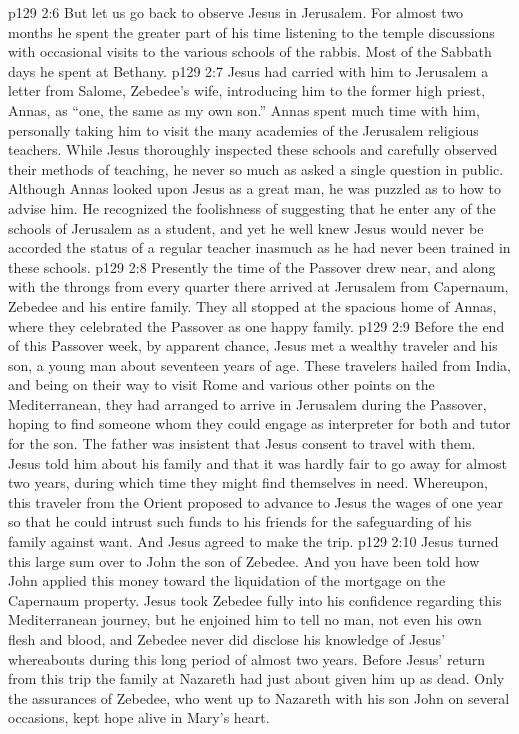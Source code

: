 \vs p129 2:6 \pc But let us go back to observe Jesus in Jerusalem. For almost two months he spent the greater part of his time listening to the temple discussions with occasional visits to the various schools of the rabbis. Most of the Sabbath days he spent at Bethany.
\vs p129 2:7 Jesus had carried with him to Jerusalem a letter from Salome, Zebedee’s wife, introducing him to the former high priest, Annas, as “one, the same as my own son.” Annas spent much time with him, personally taking him to visit the many academies of the Jerusalem religious teachers. While Jesus thoroughly inspected these schools and carefully observed their methods of teaching, he never so much as asked a single question in public. Although Annas looked upon Jesus as a great man, he was puzzled as to how to advise him. He recognized the foolishness of suggesting that he enter any of the schools of Jerusalem as a student, and yet he well knew Jesus would never be accorded the status of a regular teacher inasmuch as he had never been trained in these schools.
\vs p129 2:8 Presently the time of the Passover drew near, and along with the throngs from every quarter there arrived at Jerusalem from Capernaum, Zebedee and his entire family. They all stopped at the spacious home of Annas, where they celebrated the Passover as one happy family.
\vs p129 2:9 \pc Before the end of this Passover week, by apparent chance, Jesus met a wealthy traveler and his son, a young man about seventeen years of age. These travelers hailed from India, and being on their way to visit Rome and various other points on the Mediterranean, they had arranged to arrive in Jerusalem during the Passover, hoping to find someone whom they could engage as interpreter for both and tutor for the son. The father was insistent that Jesus consent to travel with them. Jesus told him about his family and that it was hardly fair to go away for almost two years, during which time they might find themselves in need. Whereupon, this traveler from the Orient proposed to advance to Jesus the wages of one year so that he could intrust such funds to his friends for the safeguarding of his family against want. And Jesus agreed to make the trip.
\vs p129 2:10 Jesus turned this large sum over to John the son of Zebedee. And you have been told how John applied this money toward the liquidation of the mortgage on the Capernaum property. Jesus took Zebedee fully into his confidence regarding this Mediterranean journey, but he enjoined him to tell no man, not even his own flesh and blood, and Zebedee never did disclose his knowledge of Jesus’ whereabouts during this long period of almost two years. Before Jesus’ return from this trip the family at Nazareth had just about given him up as dead. Only the assurances of Zebedee, who went up to Nazareth with his son John on several occasions, kept hope alive in Mary’s heart.
